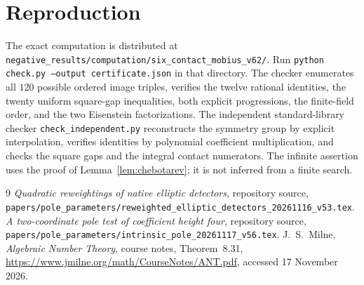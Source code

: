 \documentclass[11pt,a4paper]{article}
\begin{document}
\section{Reproduction}

The exact computation is distributed at
\nolinkurl{negative_results/computation/six_contact_mobius_v62/}.
Run \texttt{python check.py --output certificate.json} in that directory.
The checker enumerates all $120$ possible ordered image triples,
verifies the twelve rational identities, the twenty uniform square-gap
inequalities, both explicit progressions, the finite-field order,
and the two Eisenstein factorizations. The independent standard-library
checker \texttt{check\_independent.py} reconstructs the symmetry group
by explicit interpolation, verifies identities by polynomial coefficient
multiplication, and checks the square gaps and the integral contact
numerators. The infinite assertion uses the
proof of Lemma~\ref{lem:chebotarev}; it is not inferred from a finite search.

\begin{thebibliography}{9}
\emph{Quadratic reweightings of native elliptic detectors}, repository source,
\nolinkurl{papers/pole_parameters/reweighted_elliptic_detectors_20261116_v53.tex}.
\emph{A two-coordinate pole test of coefficient height four}, repository source,
\nolinkurl{papers/pole_parameters/intrinsic_pole_20261117_v56.tex}.
J.~S.~Milne, \emph{Algebraic Number Theory}, course notes, Theorem~8.31,
\url{https://www.jmilne.org/math/CourseNotes/ANT.pdf}, accessed 17 November 2026.
\end{thebibliography}
\end{document}
